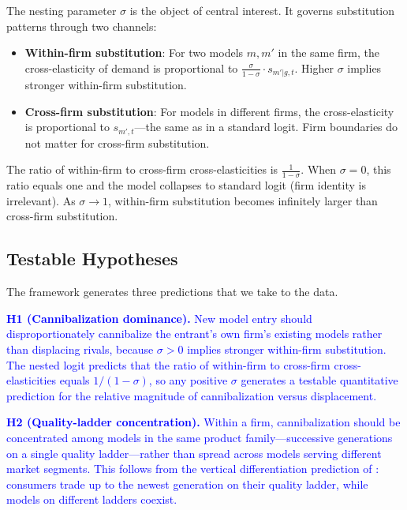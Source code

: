 \documentclass[11pt, a4paper]{article}
\begin{document}
The nesting parameter $\sigma$ is the object of central interest. It governs substitution patterns through two channels:

\begin{itemize}[nosep]
\item \textbf{Within-firm substitution}: For two models $m, m'$ in the same firm, the cross-elasticity of demand is proportional to $\frac{\sigma}{1-\sigma} \cdot s_{m'|g,t}$. Higher $\sigma$ implies stronger within-firm substitution.
\item \textbf{Cross-firm substitution}: For models in different firms, the cross-elasticity is proportional to $s_{m',t}$---the same as in a standard logit. Firm boundaries do not matter for cross-firm substitution.
\end{itemize}

The ratio of within-firm to cross-firm cross-elasticities is $\frac{1}{1-\sigma}$. When $\sigma = 0$, this ratio equals one and the model collapses to standard logit (firm identity is irrelevant). As $\sigma \to 1$, within-firm substitution becomes infinitely larger than cross-firm substitution.

\subsection{Testable Hypotheses}

The framework generates three predictions that we take to the data.

\medskip
\noindent \textcolor{blue}{\textbf{H1 (Cannibalization dominance).} New model entry should disproportionately cannibalize the entrant's own firm's existing models rather than displacing rivals, because $\sigma > 0$ implies stronger within-firm substitution. The nested logit predicts that the ratio of within-firm to cross-firm cross-elasticities equals $1/(1-\sigma)$, so any positive $\sigma$ generates a testable quantitative prediction for the relative magnitude of cannibalization versus displacement.}

\medskip
\noindent \textcolor{blue}{\textbf{H2 (Quality-ladder concentration).} Within a firm, cannibalization should be concentrated among models in the same product family---successive generations on a single quality ladder---rather than spread across models serving different market segments. This follows from the vertical differentiation prediction of \citet{shaked1982relaxing}: consumers trade up to the newest generation on their quality ladder, while models on different ladders coexist.}
\end{document}
